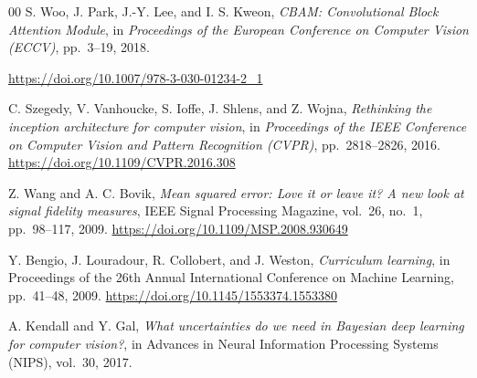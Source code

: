 \documentclass[preprint,12pt]{elsarticle}
\newcommand{\doi}[1]{\url{https://doi.org/#1}}
\begin{document}
\begin{thebibliography}{00}
  S. Woo, J. Park, J.-Y. Lee, and I. S. Kweon,
  \textit{CBAM: Convolutional Block Attention Module},
  in \textit{Proceedings of the European Conference on Computer Vision (ECCV)}, pp.~3--19, 2018.

  \doi{10.1007/978-3-030-01234-2_1}

  C. Szegedy, V. Vanhoucke, S. Ioffe, J. Shlens, and Z. Wojna,
  \textit{Rethinking the inception architecture for computer vision},
  in \textit{Proceedings of the IEEE Conference on Computer Vision and Pattern Recognition (CVPR)},
  pp.~2818--2826,
  2016.
  \doi{10.1109/CVPR.2016.308}

  Z. Wang and A. C. Bovik,
  \textit{Mean squared error: Love it or leave it? A new look at signal fidelity measures},
  IEEE Signal Processing Magazine,
  vol.~26, no.~1, pp.~98--117,
  2009.
  \doi{10.1109/MSP.2008.930649}

  Y. Bengio, J. Louradour, R. Collobert, and J. Weston,
  \textit{Curriculum learning},
  in Proceedings of the 26th Annual International Conference on Machine Learning, pp.~41--48, 2009.
  \doi{10.1145/1553374.1553380}

  A. Kendall and Y. Gal,
  \textit{What uncertainties do we need in Bayesian deep learning for computer vision?},
  in Advances in Neural Information Processing Systems (NIPS), vol.~30, 2017.
\end{thebibliography}
\end{document}
